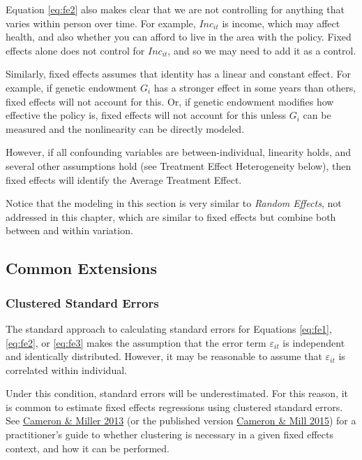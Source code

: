 \documentclass[]{book}
\theoremstyle{definition}
\theoremstyle{definition}
\theoremstyle{definition}
\theoremstyle{remark}
\begin{document}
Equation \eqref{eq:fe2} also makes clear that we are not controlling for
anything that varies within person over time. For example, \(Inc_{it}\)
is income, which may affect health, and also whether you can afford to
live in the area with the policy. Fixed effects alone does not control
for \(Inc_{it}\), and so we may need to add it as a control.

Similarly, fixed effects assumes that identity has a linear and constant
effect. For example, if genetic endowment \(G_i\) has a stronger effect
in some years than others, fixed effects will not account for this. Or,
if genetic endowment modifies how effective the policy is, fixed effects
will not account for this unless \(G_i\) can be measured and the
nonlinearity can be directly modeled.

However, if all confounding variables are between-individual, linearity
holds, and several other assumptions hold (see Treatment Effect
Heterogeneity below), then fixed effects will identify the Average
Treatment Effect.

Notice that the modeling in this section is very similar to \emph{Random
Effects}, not addressed in this chapter, which are similar to fixed
effects but combine both between and within variation.

\subsection{Common Extensions}\label{common-extensions}

\subsubsection{Clustered Standard
Errors}\label{clustered-standard-errors}

The standard approach to calculating standard errors for Equations
\eqref{eq:fe1}, \eqref{eq:fe2}, or \eqref{eq:fe3} makes the assumption that
the error term \(\varepsilon_{it}\) is independent and identically
distributed. However, it may be reasonable to assume that
\(\varepsilon_{it}\) is correlated within individual.

Under this condition, standard errors will be underestimated. For this
reason, it is common to estimate fixed effects regressions using
clustered standard errors. See
\href{http://cameron.econ.ucdavis.edu/research/Cameron_Miller_Cluster_Robust_October152013.pdf}{Cameron
\& Miller 2013} (or the published version
\href{http://jhr.uwpress.org/content/50/2/317.short}{Cameron \& Mill
2015}) for a practitioner's guide to whether clustering is necessary in
a given fixed effects context, and how it can be performed.
\end{document}
